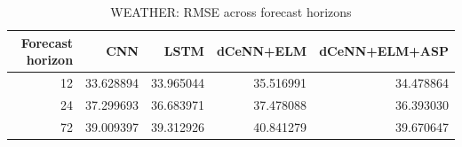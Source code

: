 \begin{table}
\caption{WEATHER: RMSE across forecast horizons}
\begin{tabular}{rrrrr}
\toprule
Forecast horizon & CNN & LSTM & dCeNN+ELM & dCeNN+ELM+ASP \\
\midrule
12 & 33.628894 & 33.965044 & 35.516991 & 34.478864 \\
24 & 37.299693 & 36.683971 & 37.478088 & 36.393030 \\
72 & 39.009397 & 39.312926 & 40.841279 & 39.670647 \\
\bottomrule
\end{tabular}
\end{table}
